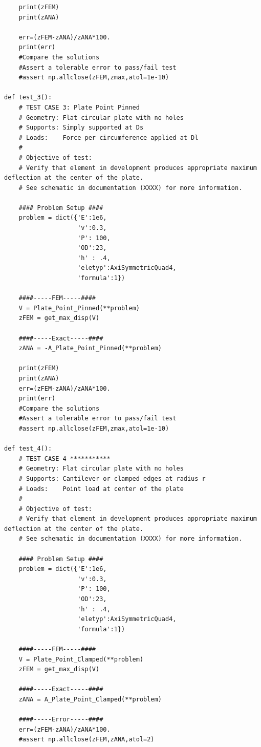 \documentclass[10pt,letterpaper]{report}
\numberwithin{equation}{chapter}
\begin{document}
\begin{lstlisting}
    print(zFEM)
    print(zANA)
    
    err=(zFEM-zANA)/zANA*100.
    print(err)
    #Compare the solutions
    #Assert a tolerable error to pass/fail test
    #assert np.allclose(zFEM,zmax,atol=1e-10)

def test_3():
    # TEST CASE 3: Plate Point Pinned
    # Geometry: Flat circular plate with no holes
    # Supports: Simply supported at Ds
    # Loads: 	Force per circumference applied at Dl
    #
    # Objective of test: 
    # Verify that element in development produces appropriate maximum deflection at the center of the plate. 
    # See schematic in documentation (XXXX) for more information.
    
    #### Problem Setup ####
    problem = dict({'E':1e6,
                    'v':0.3,
                    'P': 100,
                    'OD':23,
                    'h' : .4,
                    'eletyp':AxiSymmetricQuad4,
                    'formula':1})
    
    ####-----FEM-----####
    V = Plate_Point_Pinned(**problem)
    zFEM = get_max_disp(V)
    
    ####-----Exact-----####
    zANA = -A_Plate_Point_Pinned(**problem)
    
    print(zFEM)
    print(zANA)
    err=(zFEM-zANA)/zANA*100.
    print(err)
    #Compare the solutions
    #Assert a tolerable error to pass/fail test
    #assert np.allclose(zFEM,zmax,atol=1e-10)

def test_4():
    # TEST CASE 4 ***********
    # Geometry: Flat circular plate with no holes
    # Supports: Cantilever or clamped edges at radius r
    # Loads: 	Point load at center of the plate
    #
    # Objective of test: 
    # Verify that element in development produces appropriate maximum deflection at the center of the plate. 
    # See schematic in documentation (XXXX) for more information.
    
    #### Problem Setup ####
    problem = dict({'E':1e6,
                    'v':0.3,
                    'P': 100,
                    'OD':23,
                    'h' : .4,
                    'eletyp':AxiSymmetricQuad4,
                    'formula':1})
    
    ####-----FEM-----####
    V = Plate_Point_Clamped(**problem)
    zFEM = get_max_disp(V)
    
    ####-----Exact-----####
    zANA = A_Plate_Point_Clamped(**problem)
    
    ####-----Error-----####
    err=(zFEM-zANA)/zANA*100.
    #assert np.allclose(zFEM,zANA,atol=2)
	

\end{lstlisting}
\end{document}
